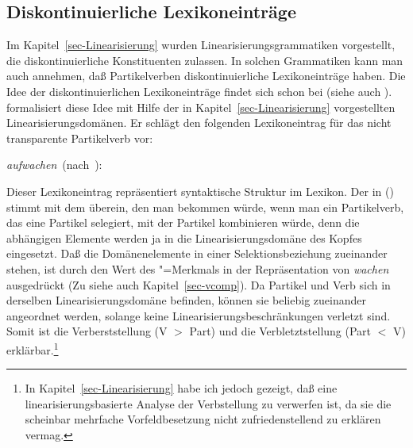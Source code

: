 \subsection{Diskontinuierliche Lexikoneinträge}
\label{sec-disc-entry}

Im Kapitel~\ref{sec-Linearisierung} wurden Linearisierungsgrammatiken vorgestellt, die
diskontinuierliche Konstituenten zulassen. In solchen Grammatiken kann man auch annehmen,
daß Partikelverben diskontinuierliche Lexikoneinträge haben. Die Idee der diskontinuierlichen
Lexikoneinträge findet sich schon bei \citet[]{Wells47a} (siehe auch ).
\citet*[--248]{Kathol95a} formalisiert diese Idee mit Hilfe
der in Kapitel~\ref{sec-Linearisierung} vorgestellten Linearisierungsdomänen.
Er schlägt den folgenden Lexikoneintrag für das nicht transparente Partikelverb  
vor:

\eas
\label{le-aufwachen-kathol}
\mbox{\emph{aufwachen} (nach \citet[]{Kathol95a}):}\\
\zs

\noindent
Dieser Lexikoneintrag repräsentiert syntaktische Struktur im Lexikon.
Der \domw in () stimmt mit dem \domw überein, den man bekommen würde,
wenn man ein Partikelverb, das eine Partikel selegiert, mit der Partikel kombinieren
würde, denn die abhängigen Elemente werden ja in die Linearisierungsdomäne
des Kopfes eingesetzt. Daß die Domänenelemente in einer Selektionsbeziehung zueinander stehen,
ist durch den Wert des \vcomp"=Merkmals in der Repräsentation von \emph{wachen} ausgedrückt
(Zu \vcomp siehe auch Kapitel~\ref{sec-vcomp}).
Da Partikel und Verb sich in derselben Linearisierungsdomäne befinden, können sie beliebig
zueinander angeordnet werden, solange keine Linearisierungsbeschränkungen verletzt sind. Somit
ist die Verberststellung (V $>$ Part) und die Verbletztstellung (Part $<$ V) erklärbar.\footnote{
  In Kapitel~\ref{sec-Linearisierung} habe ich jedoch gezeigt, daß eine linearisierungsbasierte
  Analyse der Verbstellung zu verwerfen ist, da sie die scheinbar mehrfache Vorfeldbesetzung nicht
  zufriedenstellend zu erklären vermag.%
}

